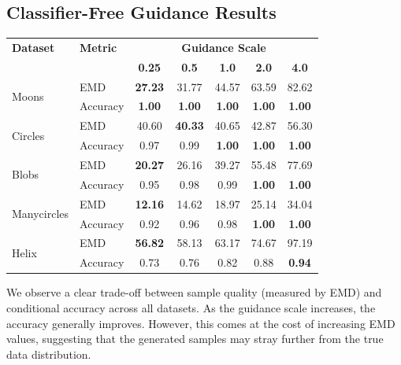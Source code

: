 \documentclass[11pt]{article}
\begin{document}
\subsection{Classifier-Free Guidance Results}

\begin{longtable}{|l|l|c|c|c|c|c|}
    \hline
    \textbf{Dataset} & \textbf{Metric} & \multicolumn{5}{c|}{\textbf{Guidance Scale}} \\
    \cline{3-7}
    & & \textbf{0.25} & \textbf{0.5} & \textbf{1.0} & \textbf{2.0} & \textbf{4.0} \\
    \hline
    \multirow{2}{*}{Moons} & EMD & \textbf{27.23} & 31.77 & 44.57 & 63.59 & 82.62 \\
    \cline{2-7}
    & Accuracy & \textbf{1.00} & \textbf{1.00} & \textbf{1.00} & \textbf{1.00} & \textbf{1.00} \\
    \hline
    \multirow{2}{*}{Circles} & EMD & 40.60 & \textbf{40.33} & 40.65 & 42.87 & 56.30 \\
    \cline{2-7}
    & Accuracy & 0.97 & 0.99 & \textbf{1.00} & \textbf{1.00} & \textbf{1.00} \\
    \hline
    \multirow{2}{*}{Blobs} & EMD & \textbf{20.27} & 26.16 & 39.27 & 55.48 & 77.69 \\
    \cline{2-7}
    & Accuracy & 0.95 & 0.98 & 0.99 & \textbf{1.00} & \textbf{1.00} \\
    \hline
    \multirow{2}{*}{Manycircles} & EMD & \textbf{12.16} & 14.62 & 18.97 & 25.14 & 34.04 \\
    \cline{2-7}
    & Accuracy & 0.92 & 0.96 & 0.98 & \textbf{1.00} & \textbf{1.00} \\
    \hline
    \multirow{2}{*}{Helix} & EMD & \textbf{56.82} & 58.13 & 63.17 & 74.67 & 97.19 \\
    \cline{2-7}
    & Accuracy & 0.73 & 0.76 & 0.82 & 0.88 & \textbf{0.94} \\
    \hline
\end{longtable}
\label{tab:cfg_results}

We observe a clear trade-off between sample quality (measured by EMD) and conditional accuracy across all datasets. As the guidance scale increases, the accuracy generally improves. However, this comes at the cost of increasing EMD values, suggesting that the generated samples may stray further from the true data distribution.
\end{document}
